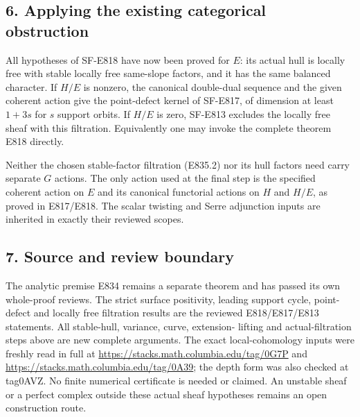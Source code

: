 \subsection{6. Applying the existing categorical
obstruction}\label{SF-E835:applying-the-existing-categorical-obstruction}

All hypotheses of SF-E818 have now been proved for \(E\): its actual hull is
locally free with stable locally free same-slope factors, and it has the
same balanced character. If \(H/E\) is nonzero, the canonical double-dual
sequence and the given coherent action give the point-defect kernel of
SF-E817, of dimension at least \(1+3s\) for \(s\) support orbits. If \(H/E\) is zero,
SF-E813 excludes the locally free sheaf with this filtration.
Equivalently one may invoke the complete theorem E818 directly.

Neither the chosen stable-factor filtration (E835.2) nor its hull factors
need carry separate \(G\) actions. The only action used at the final step is
the specified coherent action on \(E\) and its canonical functorial actions
on \(H\) and \(H/E\), as proved in E817/E818. The scalar twisting and Serre
adjunction inputs are inherited in exactly their reviewed scopes.

\subsection{7. Source and review
boundary}\label{SF-E835:source-and-review-boundary}

The analytic premise E834 remains a separate theorem and has passed its
own whole-proof reviews. The strict surface positivity, leading support
cycle, point-defect and locally free filtration results are the reviewed
E818/E817/E813 statements. All stable-hull, variance, curve, extension-
lifting and actual-filtration steps above are new complete arguments.
The exact local-cohomology inputs were freshly read in full at
\url{https://stacks.math.columbia.edu/tag/0G7P} and
\url{https://stacks.math.columbia.edu/tag/0A39}; the depth form was also
checked at tag0AVZ. No finite numerical certificate is needed or
claimed. An unstable sheaf or a perfect complex outside these actual
sheaf hypotheses remains an open construction route.
